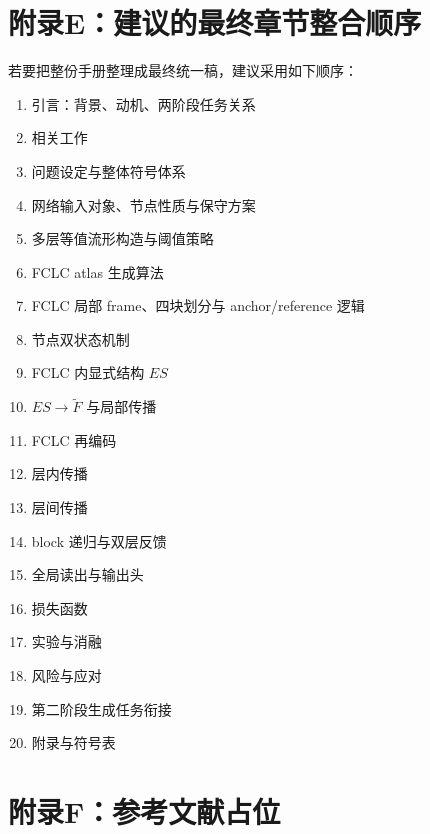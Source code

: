 \documentclass[12pt,a4paper]{ctexart}
\begin{document}
\section{附录E：建议的最终章节整合顺序}

若要把整份手册整理成最终统一稿，建议采用如下顺序：

\begin{enumerate}[leftmargin=2em]
    \item 引言：背景、动机、两阶段任务关系
    \item 相关工作
    \item 问题设定与整体符号体系
    \item 网络输入对象、节点性质与保守方案
    \item 多层等值流形构造与阈值策略
    \item FCLC atlas 生成算法
    \item FCLC 局部 frame、四块划分与 anchor/reference 逻辑
    \item 节点双状态机制
    \item FCLC 内显式结构 \(ES\)
    \item \(ES\to \tilde F\) 与局部传播
    \item FCLC 再编码
    \item 层内传播
    \item 层间传播
    \item block 递归与双层反馈
    \item 全局读出与输出头
    \item 损失函数
    \item 实验与消融
    \item 风险与应对
    \item 第二阶段生成任务衔接
    \item 附录与符号表
\end{enumerate}

\section{附录F：参考文献占位}
\end{document}
